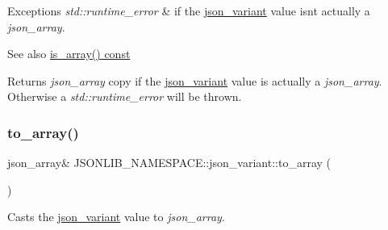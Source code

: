 \begin{DoxyExceptions}{Exceptions}
{\em std\+::runtime\+\_\+error} & if the \hyperlink{classJSONLIB__NAMESPACE_1_1json__variant}{json\+\_\+variant} value isn\textquotesingle{}t actually a {\itshape json\+\_\+array}. \\
\hline
\end{DoxyExceptions}
\begin{DoxySeeAlso}{See also}
\hyperlink{classJSONLIB__NAMESPACE_1_1json__variant_a72349dff71a411ac24eea6d943772df7}{is\+\_\+array() const} 
\end{DoxySeeAlso}
\begin{DoxyReturn}{Returns}
{\itshape json\+\_\+array} copy if the \hyperlink{classJSONLIB__NAMESPACE_1_1json__variant}{json\+\_\+variant} value is actually a {\itshape json\+\_\+array}. Otherwise a {\itshape std\+::runtime\+\_\+error} will be thrown. 
\end{DoxyReturn}
\mbox{\label{classJSONLIB__NAMESPACE_1_1json__variant_acda05aeecb0977c0b7555e5874cb61ee}} 
\subsubsection{\texorpdfstring{to\+\_\+array()}{to\_array()}\hspace{0.1cm}{\footnotesize\ttfamily [4/4]}}
{\footnotesize\ttfamily json\+\_\+array\& J\+S\+O\+N\+L\+I\+B\+\_\+\+N\+A\+M\+E\+S\+P\+A\+C\+E\+::json\+\_\+variant\+::to\+\_\+array (\begin{DoxyParamCaption}{ }\end{DoxyParamCaption})}



Casts the \hyperlink{classJSONLIB__NAMESPACE_1_1json__variant}{json\+\_\+variant} value to {\itshape json\+\_\+array}. 


